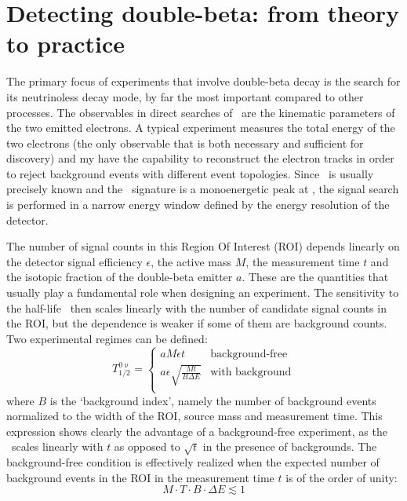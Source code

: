 \begin{table}
  \centering
  \caption{%
    Compilation of current experimental bounds at 90\% C.L.~on the Lorentz-violating \aof\
    coefficient from double-beta decay.
  }\label{tab:nbb:2nbblv-lim}
  
\end{table}

\section{Detecting double-beta: from theory to practice}%
\label{sec:nbb:exp}

The primary focus of experiments that involve double-beta decay is the search
for its neutrinoless decay mode, by far the most important compared to other
processes. The observables in direct searches of \onbb\ are the kinematic
parameters of the two emitted electrons. A typical experiment measures the
total energy of the two electrons (the only observable that is both necessary
and sufficient for discovery) and my have the capability to reconstruct the
electron tracks in order to reject background events with different event
topologies. Since \qbb\ is usually precisely known and the \onbb\ signature is
a monoenergetic peak at \qbb, the signal search is performed in a narrow energy
window defined by the energy resolution of the detector.

The number of signal counts in this Region Of Interest (ROI) depends linearly
on the detector signal efficiency $\epsilon$, the active mass $M$, the
measurement time $t$ and the isotopic fraction of the double-beta emitter $a$.
These are the quantities that usually play a fundamental role when designing an
experiment. The sensitivity to the half-life \thalfzero\ then scales linearly
with the number of candidate signal counts in the ROI, but the dependence is
weaker if some of them are background counts. Two experimental regimes can be
defined:
\begin{equation}\label{eq:nbb:bkglevel}
  T^{0\upnu}_{1/2} =
    \begin{cases}
      a M \epsilon t & \text{background-free} \\
      a \epsilon \sqrt{\frac{M t}{B \Delta{E}}} & \text{with background} \\
    \end{cases}
\end{equation}
where $B$ is the `background index', namely the number of background events
normalized to the width of the ROI, source mass and measurement time. This
expression shows clearly the advantage of a background-free experiment, as the
\thalfzero\ scales linearly with $t$ as opposed to $\sqrt{t}$ in the presence
of backgrounds. The background-free condition is effectively realized when the
expected number of background events in the ROI in the measurement time $t$ is
of the order of unity:
\[
  M \cdot T \cdot B \cdot \Delta{E} \lesssim 1
\]

